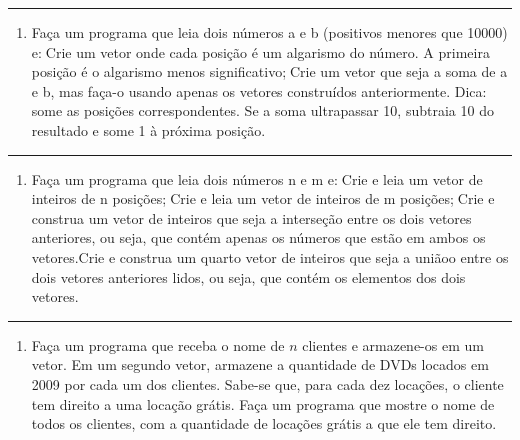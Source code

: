 \documentclass[12pt,a4paper]{article}
\renewcommand{\linethickness}{0.05em}
\providecommand{\tightlist}{%
      \setlength{\itemsep}{0pt}\setlength{\parskip}{0pt}}
\begin{document}
    \begin{center}\rule{0.5\linewidth}{\linethickness}\end{center}

\begin{enumerate}
\def\labelenumi{\arabic{enumi}.}
\setcounter{enumi}{29}
\tightlist
\item
  Faça um programa que leia dois números a e b (positivos menores que
  10000) e:Crie um vetor onde cada posição é um algarismo do número. A
  primeira posição é o algarismo menos significativo;Crie um vetor que
  seja a soma de a e b, mas faça-o usando apenas os vetores construídos
  anteriormente. Dica: some as posições correspondentes. Se a soma
  ultrapassar 10, subtraia 10 do resultado e some 1 à próxima posição.
\end{enumerate}

    \begin{center}\rule{0.5\linewidth}{\linethickness}\end{center}

\begin{enumerate}
\def\labelenumi{\arabic{enumi}.}
\setcounter{enumi}{30}
\tightlist
\item
  Faça um programa que leia dois números n e m e:Crie e leia um vetor
  de inteiros de n posições;Crie e leia um vetor de inteiros de m
  posições;Crie e construa um vetor de inteiros que seja a interseção
  entre os dois vetores anteriores, ou seja, que contém apenas os
  números que estão em ambos os vetores.Crie e construa um quarto vetor
  de inteiros que seja a uniãoo entre os dois vetores anteriores lidos,
  ou seja, que contém os elementos dos dois vetores.
\end{enumerate}

    \begin{center}\rule{0.5\linewidth}{\linethickness}\end{center}

\begin{enumerate}
\def\labelenumi{\arabic{enumi}.}
\setcounter{enumi}{31}
\tightlist
\item
  Faça um programa que receba o nome de \(n\) clientes e armazene-os em
  um vetor. Em um segundo vetor, armazene a quantidade de DVDs locados
  em 2009 por cada um dos clientes. Sabe-se que, para cada dez locações,
  o cliente tem direito a uma locação grátis. Faça um programa que
  mostre o nome de todos os clientes, com a quantidade de locações
  grátis a que ele tem direito.
\end{enumerate}
\end{document}
